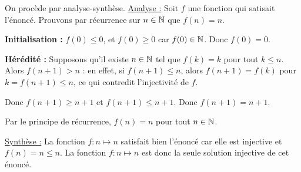 \documentclass[]{../templates/homework}
\begin{document}
\subproblem
On procède par analyse-synthèse.
\underline{Analyse :} Soit $f$ une fonction qui satisait l'énoncé. Prouvons par récurrence sur $n\in\mathbb N$ que $f(n) = n$.

\textbf{Initialisation :} $f(0) \leq 0$, et $f(0) \geq 0$ car $f(0) \in \mathbb N$. Donc $f(0) = 0$.

\textbf{Hérédité :} Supposons qu'il existe $n\in\mathbb N$ tel que $f(k) = k$ pour tout $k \leq n$. Alors $f(n+1) > n$ : en effet, si $f(n+1) \leq n$, alors $f(n+1) = f(k)$ pour $k = f(n+1) \leq n$, ce qui contredit l'injectivité de $f$.

Donc $f(n+1) \geq n+1$ et $f(n+1) \leq n+1$. Donc $f(n+1) = n+1$.

Par le principe de récurrence, $f(n) = n$ pour tout $n\in\mathbb N$.

\underline{Synthèse :} La fonction $f:n\mapsto n$ satisfait bien l'énoncé car elle est injective et $f(n) = n \leq n$. La fonction $f:n \mapsto n$ est donc la seule solution injective de cet énoncé.
\end{document}
